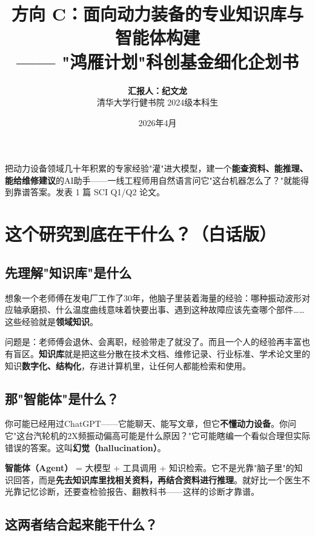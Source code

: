 \documentclass[a4paper, 11pt]{ctexart}
\title{\vspace{-1.5cm}\color{tsinghua}\textbf{方向 C：面向动力装备的专业知识库与智能体构建}\\\Large{—— "鸿雁计划"科创基金细化企划书}}
\author{\textbf{汇报人：纪文龙} \\ \small 清华大学行健书院 2024级本科生}
\date{\small 2026年4月}
\begin{document}
\maketitle
\thispagestyle{empty}

\begin{tcolorbox}[colback=tsinghua!5, colframe=tsinghua!50, title=\textbf{一句话概括}, fonttitle=\bfseries]
把动力设备领域几十年积累的专家经验"灌"进大模型，建一个\textbf{能查资料、能推理、能给维修建议}的AI助手——一线工程师用自然语言问它"这台机器怎么了？"就能得到靠谱答案。发表 1 篇 SCI Q1/Q2 论文。
\end{tcolorbox}

\section{这个研究到底在干什么？（白话版）}

\subsection{先理解"知识库"是什么}

想象一个老师傅在发电厂工作了30年，他脑子里装着海量的经验：哪种振动波形对应轴承磨损、什么温度曲线意味着快要出事、遇到这种故障应该先查哪个部件……这些经验就是\textbf{领域知识}。

问题是：老师傅会退休、会离职，经验带走了就没了。而且一个人的经验再丰富也有盲区。\textbf{知识库}就是把这些分散在技术文档、维修记录、行业标准、学术论文里的知识\textbf{数字化、结构化}，存进计算机里，让任何人都能检索和使用。

\subsection{那"智能体"是什么？}

你可能已经用过ChatGPT——它能聊天、能写文章，但它\textbf{不懂动力设备}。你问它"这台汽轮机的2X频振动偏高可能是什么原因？"它可能瞎编一个看似合理但实际错误的答案。这叫\textbf{幻觉（hallucination）}。

\textbf{智能体（Agent）} = 大模型 + 工具调用 + 知识检索。它不是光靠"脑子里"的知识回答，而是\textbf{先去知识库里找相关资料，再结合资料进行推理}。就好比一个医生不光靠记忆诊断，还要查检验报告、翻教科书——这样的诊断才靠谱。

\subsection{这两者结合起来能干什么？}
\end{document}
